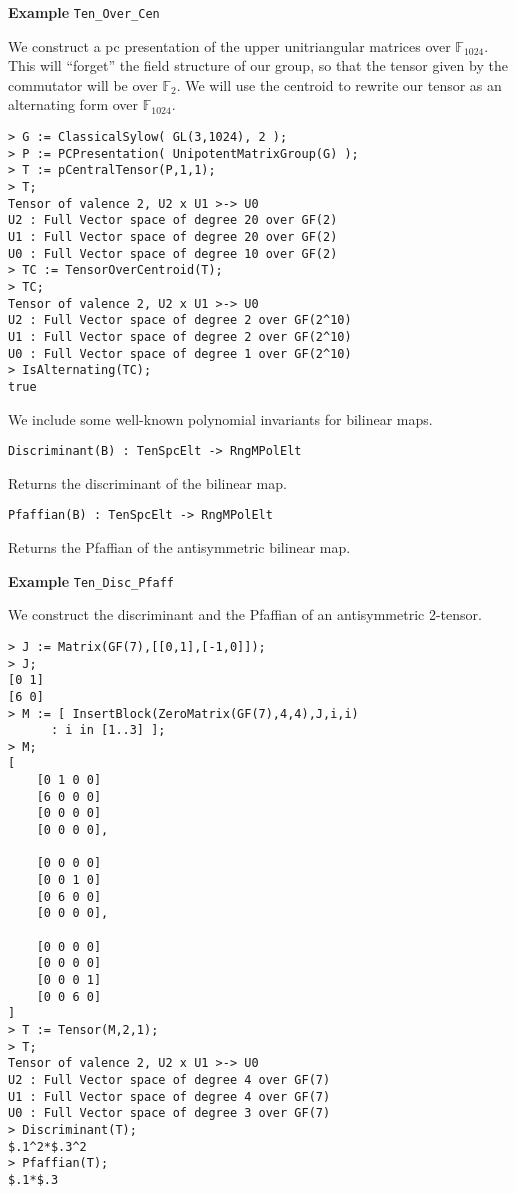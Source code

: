 \medskip
\begin{framed} {\bf Example} {\tt Ten\_Over\_Cen}\\
{\small We construct a pc presentation of the upper unitriangular matrices over $\mathbb{F}_{1024}$. 
This will ``forget'' the field structure of our group, so that the tensor given by the commutator will be over $\mathbb{F}_2$.
We will use the centroid to rewrite our tensor as an alternating form over $\mathbb{F}_{1024}$.
\begin{lstlisting}[frame=single,basicstyle=\ttfamily\color{black!30!
teal},backgroundcolor=\color{white!70!gray}]
> G := ClassicalSylow( GL(3,1024), 2 );
> P := PCPresentation( UnipotentMatrixGroup(G) );
> T := pCentralTensor(P,1,1);
> T;
Tensor of valence 2, U2 x U1 >-> U0
U2 : Full Vector space of degree 20 over GF(2)
U1 : Full Vector space of degree 20 over GF(2)
U0 : Full Vector space of degree 10 over GF(2)
> TC := TensorOverCentroid(T);
> TC;
Tensor of valence 2, U2 x U1 >-> U0
U2 : Full Vector space of degree 2 over GF(2^10)
U1 : Full Vector space of degree 2 over GF(2^10)
U0 : Full Vector space of degree 1 over GF(2^10)
> IsAlternating(TC);
true
\end{lstlisting} }
\end{framed}


We include some well-known polynomial invariants for bilinear maps.
\color{blue}
{\small \begin{verbatim}
Discriminant(B) : TenSpcElt -> RngMPolElt
\end{verbatim} }
\color{black}

Returns the discriminant of the bilinear map.

\color{blue}
{\small \begin{verbatim}
Pfaffian(B) : TenSpcElt -> RngMPolElt
\end{verbatim} }
\color{black}

Returns the Pfaffian of the antisymmetric bilinear map.

\begin{framed} {\bf Example} {\tt Ten\_Disc\_Pfaff}\\
{\small We construct the discriminant and the Pfaffian of an antisymmetric 2-tensor.
\begin{lstlisting}[frame=single,basicstyle=\ttfamily\color{black!30!
teal},backgroundcolor=\color{white!70!gray}]
> J := Matrix(GF(7),[[0,1],[-1,0]]);
> J;
[0 1]
[6 0]
> M := [ InsertBlock(ZeroMatrix(GF(7),4,4),J,i,i) 
      : i in [1..3] ]; 
> M;
[
    [0 1 0 0]
    [6 0 0 0]
    [0 0 0 0]
    [0 0 0 0],

    [0 0 0 0]
    [0 0 1 0]
    [0 6 0 0]
    [0 0 0 0],

    [0 0 0 0]
    [0 0 0 0]
    [0 0 0 1]
    [0 0 6 0]
]
> T := Tensor(M,2,1);
> T;
Tensor of valence 2, U2 x U1 >-> U0
U2 : Full Vector space of degree 4 over GF(7)
U1 : Full Vector space of degree 4 over GF(7)
U0 : Full Vector space of degree 3 over GF(7)
> Discriminant(T);
$.1^2*$.3^2
> Pfaffian(T);
$.1*$.3
\end{lstlisting} }
\end{framed}


